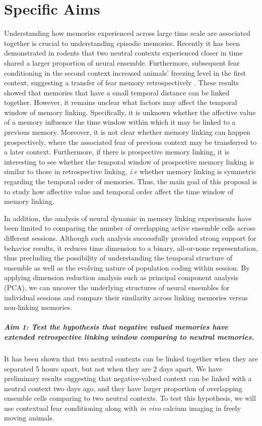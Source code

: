 \documentclass[master.tex]{subfiles}
\begin{document}
\section*{Specific Aims}

Understanding how memories experienced across large time scale are associated
together is crucial to understanding episodic memories. Recently it has been
demonstrated in rodents that two neutral contexts experienced closer in time
shared a larger proportion of neural ensemble. Furthermore, subsequent fear
conditioning in the second context increased animals' freezing level in the
first context, suggesting a transfer of fear memory retrospectively
\cite{cai_shared_2016}. These results showed that memories that have a small
temporal distance can be linked together. However, it remains unclear what
factors may affect the temporal window of memory linking. Specifically, it is
unknown whether the affective value of a memory influence the time window within
which it may be linked to a previous memory. Moreover, it is not clear whether
memory linking can happen prospectively, where the associated fear of previous
context may be transferred to a later context. Furthermore, if there is
prospective memory linking, it is interesting to see whether the temporal window
of prospective memory linking is similar to those in retrospective linking,
\textit{i.e} whether memory linking is symmetric regarding the temporal order of
memories. Thus, the main goal of this proposal is to study how affective value
and temporal order affect the time window of memory linking.

In addition, the analysis of neural dynamic in memory linking experiments have
been limited to comparing the number of overlapping active ensemble cells across
different sessions. Although such analysis successfully provided strong support for
behavior results, it reduces time dimension to a binary, all-or-none
representation, thus precluding the possibility of understanding the temporal
structure of ensemble as well as the evolving nature of population coding within
session. By applying dimension reduction analysis such as principal component
analysis (PCA), we can uncover the underlying structures of neural ensembles for
individual sessions and compare their similarity across linking memories versus
non-linking memories.

\subparagraph{Aim 1: Test the hypothesis that negative valued memories have
  extended retrospective linking window comparing to neutral memories.} It has
been shown that two neutral contexts can be linked together when they are
separated 5 hours apart, but not when they are 2 days apart. We have preliminary
results suggesting that negative-valued context can be linked with a neutral
context two days ago, and they have larger proportion of overlapping ensemble
cells comparing to two neutral contexts. To test this hypothesis, we will use
contextual fear conditioning along with \textit{in vivo} calcium imaging in
freely moving animals.
\end{document}
